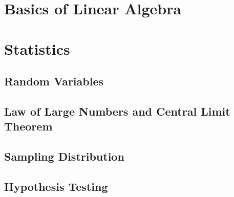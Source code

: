 \part{Basics of Linear Algebra}






\part{Statistics}
\chapter{Random Variables}


\chapter{Law of Large Numbers and Central Limit Theorem}


\chapter{Sampling Distribution}


\chapter{Hypothesis Testing}

